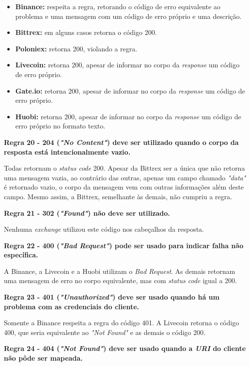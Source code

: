 \begin{itemize}
    \item \textbf{Binance:} respeita a regra, retorando o código de erro equivalente ao problema e uma mensagem com um código de erro próprio e uma descrição.
    \item \textbf{Bittrex:} em alguns casos retorna o código 200.
    \item \textbf{Poloniex:} retorna 200, violando a regra.
    \item \textbf{Livecoin:} retorna 200, apesar de informar no corpo da \textit{response} um código de erro próprio.
    \item \textbf{Gate.io:} retorna 200, apesar de informar no corpo da \textit{response} um código de erro próprio.
    \item \textbf{Huobi:} retorna 200, apesar de informar no corpo da \textit{response} um código de erro próprio no formato texto.
\end{itemize}

\textbf{Regra 20 - 204 (\textit{"No Content"}) deve ser utilizado quando o corpo da resposta está intencionalmente vazio.}

Todas retornam o \textit{status code} 200. Apesar da Bittrex ser a única que não retorna uma mensagem vazia, ao contrário das outras, apenas um campo chamado \textit{"data"} é retornado vazio, o corpo da mensagem vem com outras informações além deste campo. Mesmo assim, a Bittrex, semelhante às demais, não cumpriu a regra.

\textbf{Regra 21 - 302 (\textit{"Found"}) não deve ser utilizado.}

Nenhuma \textit{exchange} utilizou este código nos cabeçalhos da resposta.

\textbf{Regra 22 - 400 (\textit{"Bad Request"}) pode ser usado para indicar falha não específica.}

A Binance, a Livecoin e a Huobi utilizam o \textit{Bad Request}. As demais retornam uma mensagem de erro no corpo equivalente, mas com \textit{status code} igual a 200.

\textbf{Regra 23 - 401 (\textit{"Unauthorized"}) deve ser usado quando há um problema com as credenciais do cliente.}

Somente a Binance respeita a regra do código 401. A Livecoin retorna o código 400, que seria equivalente ao \textit{"Not Found"} e as demais o código 200.

\textbf{Regra 24 - 404 (\textit{"Not Found"}) deve ser usado quando a \textit{URI} do cliente não pôde ser mapeada.}

